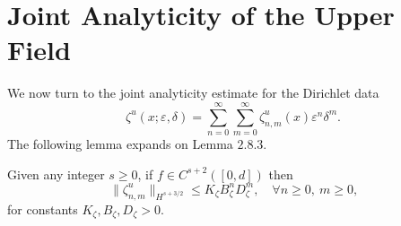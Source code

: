 \section{Joint Analyticity of the Upper Field}
\label{intro:further properties analticity}

We now turn to the joint analyticity estimate for the Dirichlet data
$$\zeta^u(x;\varepsilon,\delta) =  \sum_{n=0}^{\infty}\sum_{m=0}^{\infty} \zeta^u_{n,m}(x)\varepsilon^n\delta^m. $$
The following lemma expands on Lemma $2.8.3.$
\vskip 0.1in
\begin{lemma} Given any integer $s\ge 0$, if $f\in C^{s+2}([0,d])$ then
\begin{equation}\|\zeta^u_{n,m}\|_{H^{s+3/2}}\le K_{\zeta}B_{\zeta}^nD_{\zeta}^m,\quad
\text{$\forall n\ge 0, ~m\ge 0$,}\end{equation}
for constants $K_{\zeta},B_{\zeta},D_{\zeta} > 0$.
\end{lemma}

